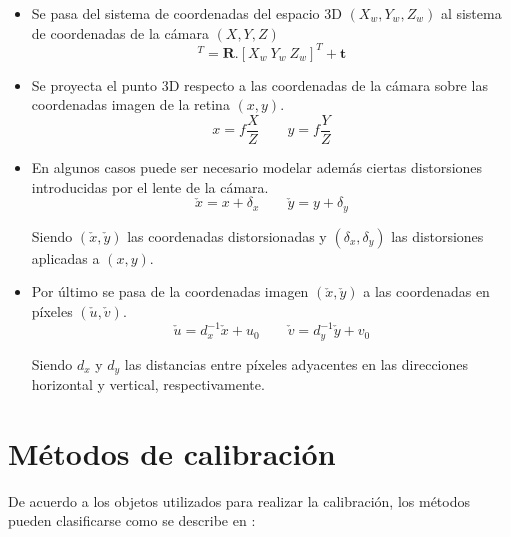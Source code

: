 \begin{itemize}
\item Se pasa del sistema de coordenadas del espacio 3D $(X_w, Y_w, Z_w)$ al sistema de coordenadas de la cámara $(X,Y, Z)$
\begin{equation*}
[X \ Y \ Z]^T = \mathbf{R}.[X_w \ Y_w \ Z_w]^T + \mathbf{t}
\end{equation*}
\item Se proyecta el punto 3D respecto a las coordenadas de la cámara sobre las coordenadas imagen de la retina $(x,y)$.
\begin{equation*}
x=f \dfrac{X}{Z} \qquad y = f\dfrac{Y}{Z}
\end{equation*}
\item En algunos casos puede ser necesario modelar además ciertas distorsiones introducidas por el lente de la cámara.
\begin{equation*}
\check{x} = x + \delta_x \qquad \check{y} = y + \delta_y
\end{equation*}

Siendo $(\check{x},\check{y})$ las coordenadas distorsionadas y $(\delta_x, \delta_y)$ las distorsiones aplicadas a $(x,y)$.

\item Por último se pasa de la coordenadas imagen $(\check{x}, \check{y})$ a las coordenadas en píxeles $(\check{u}, \check{v})$.
\vspace{-0.05cm}
\begin{equation*}
\check{u} = d_x ^{-1}\check{x} + u_0 \qquad \check{v} = d_y ^{-1}\check{y} + v_0
\end{equation*}

Siendo $d_x$ y $d_y$ las distancias entre píxeles adyacentes en las direcciones horizontal y vertical, respectivamente.
\end{itemize}


\section{Métodos de calibración}

De acuerdo a los objetos utilizados para realizar la calibración, los métodos pueden clasificarse como se describe en \cite{zhang_libro}:

